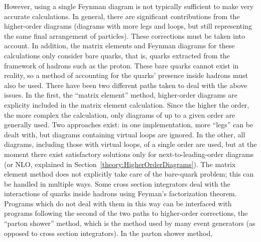 


However, using a single Feynman diagram is not typically 
sufficient to make very accurate calculations.  
In general, there are significant contributions from 
the higher-order diagrams  
(diagrams with more legs and loops, 
but still representing the same final arrangement of particles). 
These corrections must be taken into account.  
In addition, the matrix elements and Feynman diagrams 
for these calculations only consider bare quarks, 
that is, quarks extracted from the framework of 
hadrons such as the proton.  
These bare quarks cannot exist in reality, 
so a method of accounting for the quarks' 
presence inside hadrons must also be used.  
There have been two different paths taken to deal %
with the above issues.  
In the first, the ``matrix element'' method, 
higher-order diagrams are explicity included in 
the matrix element calculation.  
Since the higher the order, 
the more complex the calculation, 
only diagrams of up to a given order are 
generally used.  
Two approaches exist: 
in one implementation, more ``legs'' can be dealt with, %
but diagrams containing virtual loops are ignored.  %
In the other, all diagrams, including those with virtual 
loops, of a single order are used, 
but at the moment there exist satisfactory solutions 
only for next-to-leading-order diagrams 
(or NLO, explained in 
Section~\ref{theory:HigherOrderDiagrams}).  
The matrix element method does not explicitly 
take care of the bare-quark problem; %
this can be handled in multiple ways.  
Some cross section integrators deal with the interactions of %
quarks inside hadrons using Feyman's factorization theorem. 
Programs which do not deal with them in this way 
can be interfaced with programs following the 
second of the two paths to higher-order corrections, %
the ``parton shower'' method, 
which is the method used by many event generators 
(as opposed to cross section integrators).  
In the parton shower method, 
